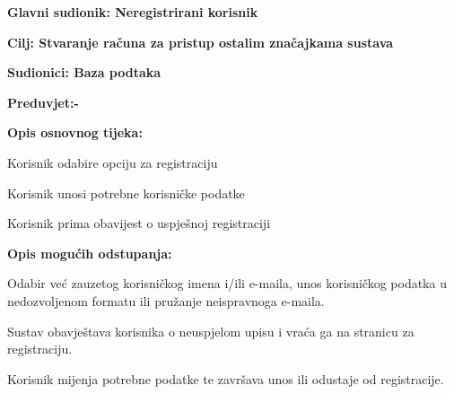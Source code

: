 					
					\noindent {}
					\begin{packed_item}
						
						\item \textbf{Glavni sudionik: Neregistrirani korisnik}
						\item  \textbf{Cilj: Stvaranje računa za pristup ostalim značajkama sustava}  
						\item  \textbf{Sudionici: Baza podtaka} 
						\item  \textbf{Preduvjet:-} 
						\item  \textbf{Opis osnovnog tijeka:}
						
						\item[] \begin{packed_enum}
							
							\item Korisnik odabire opciju za registraciju
							\item Korisnik unosi potrebne korisničke podatke
							\item Korisnik prima obavijest o uspješnoj registraciji
						\end{packed_enum}
						
						\item  \textbf{Opis mogućih odstupanja:}
						
						\item[] \begin{packed_item}
							
							\item[2.a] Odabir već zauzetog korisničkog imena i/ili e-maila, unos korisničkog podatka u nedozvoljenom formatu ili pružanje neispravnoga e-maila.
							\item[] \begin{packed_enum}
								
								\item  Sustav obavještava korisnika o neuspjelom upisu i vraća ga na stranicu za registraciju.
								\item Korisnik mijenja potrebne podatke te završava unos ili odustaje od registracije.
								
							\end{packed_enum}
							
						\end{packed_item}
					\end{packed_item}
					
